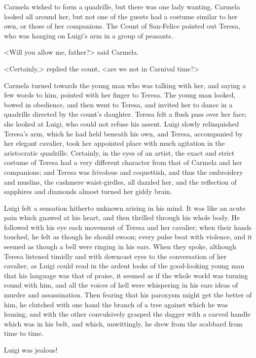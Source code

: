 {Carmela wished to form a quadrille, but there was one lady wanting. Carmela looked all around her, but not one of the guests had a costume similar to her own, or those of her companions. The Count of San-Felice pointed out Teresa, who was hanging on Luigi's arm in a group of peasants. 

<Will you allow me, father?> said Carmela. 

<Certainly,> replied the count, <are we not in Carnival time?> 

Carmela turned towards the young man who was talking with her, and saying a few words to him, pointed with her finger to Teresa. The young man looked, bowed in obedience, and then went to Teresa, and invited her to dance in a quadrille directed by the count's daughter. Teresa felt a flush pass over her face; she looked at Luigi, who could not refuse his assent. Luigi slowly relinquished Teresa's arm, which he had held beneath his own, and Teresa, accompanied by her elegant cavalier, took her appointed place with much agitation in the aristocratic quadrille. Certainly, in the eyes of an artist, the exact and strict costume of Teresa had a very different character from that of Carmela and her companions; and Teresa was frivolous and coquettish, and thus the embroidery and muslins, the cashmere waist-girdles, all dazzled her, and the reflection of sapphires and diamonds almost turned her giddy brain. 

Luigi felt a sensation hitherto unknown arising in his mind. It was like an acute pain which gnawed at his heart, and then thrilled through his whole body. He followed with his eye each movement of Teresa and her cavalier; when their hands touched, he felt as though he should swoon; every pulse beat with violence, and it seemed as though a bell were ringing in his ears. When they spoke, although Teresa listened timidly and with downcast eyes to the conversation of her cavalier, as Luigi could read in the ardent looks of the good-looking young man that his language was that of praise, it seemed as if the whole world was turning round with him, and all the voices of hell were whispering in his ears ideas of murder and assassination. Then fearing that his paroxysm might get the better of him, he clutched with one hand the branch of a tree against which he was leaning, and with the other convulsively grasped the dagger with a carved handle which was in his belt, and which, unwittingly, he drew from the scabbard from time to time. 

Luigi was jealous! 

}
